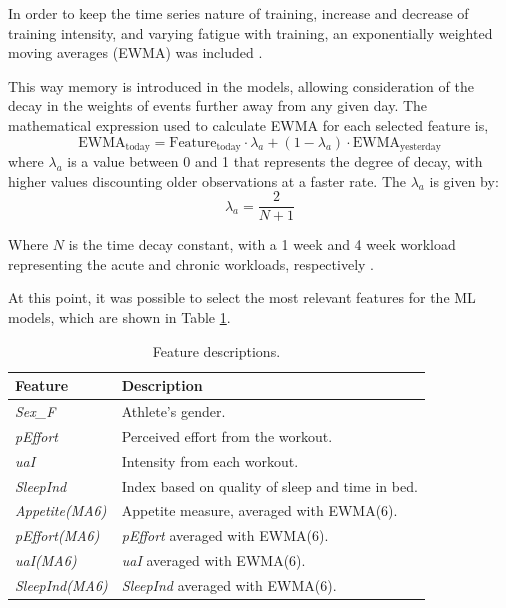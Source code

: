 \documentclass[conference]{IEEEtran}
\begin{document}
In order to keep the time series nature of training, increase and decrease of training intensity, and varying fatigue with training, an exponentially weighted moving averages (EWMA) was included \cite{Williams17}.

This way memory is introduced in the models, allowing consideration of the decay in the weights of events further away from any given day. The mathematical expression used to calculate EWMA for each selected feature is,
\begin{equation*}
    \text{EWMA}_{\text{today}} = \text{Feature}_{\text{today}} \cdot \lambda_a + (1 - \lambda_a) \cdot \text{EWMA}_{\text{yesterday}}
\end{equation*}
where $\lambda_a$ is a value between 0 and 1 that represents the degree of decay, with higher values discounting older observations at a faster rate. The $\lambda_a$ is given by:
\begin{equation*}
    \lambda_a = \frac{2}{N + 1}
\end{equation*} 

Where $N$ is the time decay constant, with a 1 week and 4 week workload representing the acute and chronic workloads, respectively \cite{Murray16}.

At this point, it was possible to select the most relevant features for the ML models, which are shown in Table \ref{features_selection}.

\begin{table}[H]
\centering
\caption{Feature descriptions.}
\label{features_selection}
\begin{tabular}{ll}
\toprule
\textbf{Feature} & \textbf{Description} \\
\midrule
\textit{Sex\_F} & Athlete's gender.  \\
\textit{pEffort} & Perceived effort from the workout. \\
\textit{uaI} & Intensity from each workout. \\
\textit{SleepInd} & Index based on quality of sleep and time in bed. \\
\textit{Appetite(MA6)} & Appetite measure, averaged with EWMA(6). \\
\textit{pEffort(MA6)} & \textit{pEffort} averaged with EWMA(6). \\
\textit{uaI(MA6)} & \textit{uaI} averaged with EWMA(6). \\
\textit{SleepInd(MA6)} & \textit{SleepInd} averaged with EWMA(6). \\
\bottomrule
\end{tabular}
\end{table}
\end{document}
